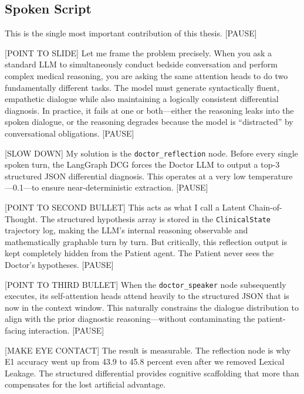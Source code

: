 \documentclass[12pt]{article}
\begin{document}
  \subsection*{Spoken Script}
  \begin{spokenbox}
   This is the single most important contribution of this thesis. [PAUSE]

  [POINT TO SLIDE] Let me frame the problem precisely. When you ask a standard LLM to simultaneously conduct bedside conversation and perform complex medical reasoning, you are asking the same attention heads to do two fundamentally different tasks. The model must generate syntactically fluent, empathetic dialogue while also maintaining a logically consistent differential diagnosis. In practice, it fails at one or both---either the reasoning leaks into the spoken dialogue, or the reasoning degrades because the model is ``distracted'' by conversational obligations. [PAUSE]

  [SLOW DOWN] My solution is the \texttt{doctor\_reflection} node. Before every single spoken turn, the LangGraph DCG forces the Doctor LLM to output a top-3 structured JSON differential diagnosis. This operates at a very low temperature---0.1---to ensure near-deterministic extraction. [PAUSE]

  [POINT TO SECOND BULLET] This acts as what I call a Latent Chain-of-Thought. The structured hypothesis array is stored in the \texttt{ClinicalState} trajectory log, making the LLM's internal reasoning observable and mathematically graphable turn by turn. But critically, this reflection output is kept completely hidden from the Patient agent. The Patient never sees the Doctor's hypotheses. [PAUSE]

  [POINT TO THIRD BULLET] When the \texttt{doctor\_speaker} node subsequently executes, its self-attention heads attend heavily to the structured JSON that is now in the context window. This naturally constrains the dialogue distribution to align with the prior diagnostic reasoning---without contaminating the patient-facing interaction. [PAUSE]

  [MAKE EYE CONTACT] The result is measurable. The reflection node is why E1 accuracy went up from 43.9 to 45.8 percent even after we removed Lexical Leakage. The structured differential provides cognitive scaffolding that more than compensates for the lost artificial advantage.
  \end{spokenbox}
\end{document}
